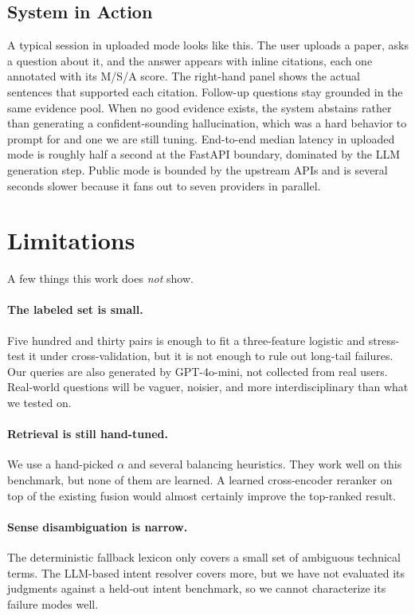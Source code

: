 \documentclass[10pt]{article}
\begin{document}
\subsection{System in Action}
A typical session in uploaded mode looks like this. The user uploads
a paper, asks a question about it, and the answer appears with
inline citations, each one annotated with its M/S/A score. The
right-hand panel shows the actual sentences that supported each
citation. Follow-up questions stay grounded in the same evidence
pool. When no good evidence exists, the system abstains rather than
generating a confident-sounding hallucination, which was a hard
behavior to prompt for and one we are still tuning.
End-to-end median latency in uploaded mode is roughly half a second
at the FastAPI boundary, dominated by the LLM generation step.
Public mode is bounded by the upstream APIs and is several seconds
slower because it fans out to seven providers in parallel.

\section{Limitations}
\label{sec:limitations}

A few things this work does \emph{not} show.

\paragraph{The labeled set is small.}
Five hundred and thirty pairs is enough to fit a three-feature
logistic and stress-test it under cross-validation, but it is not
enough to rule out long-tail failures. Our queries are also generated
by GPT-4o-mini, not collected from real users. Real-world questions
will be vaguer, noisier, and more interdisciplinary than what we
tested on.

\paragraph{Retrieval is still hand-tuned.}
We use a hand-picked $\alpha$ and several balancing heuristics. They
work well on this benchmark, but none of them are learned. A learned
cross-encoder reranker on top of the existing fusion would almost
certainly improve the top-ranked result.

\paragraph{Sense disambiguation is narrow.}
The deterministic fallback lexicon only covers a small set of
ambiguous technical terms. The LLM-based intent resolver covers more,
but we have not evaluated its judgments against a held-out intent
benchmark, so we cannot characterize its failure modes well.
\end{document}
